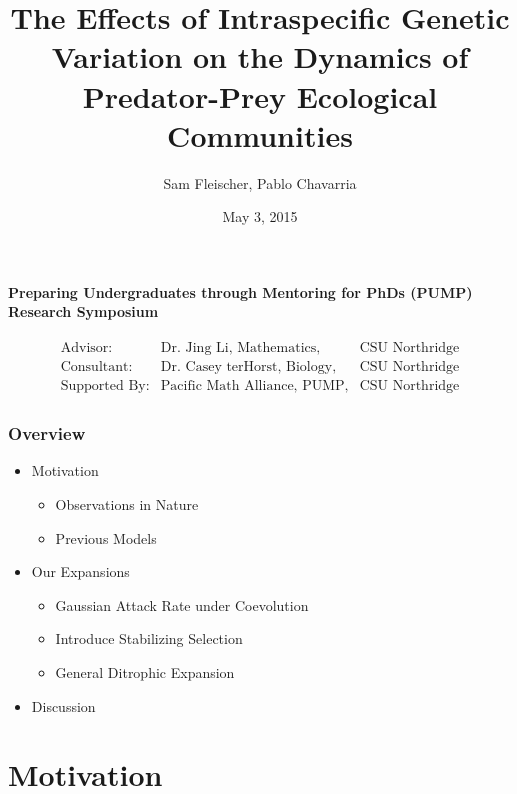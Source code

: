 \documentclass[10pt]{beamer}
\title{The Effects of Intraspecific Genetic Variation on the Dynamics of Predator-Prey Ecological Communities}
\author{\vspace{-15pt} Sam Fleischer, Pablo Chavarria}
\date{\vspace{-5pt} May 3, 2015}
\begin{document}
\begin{frame}
	\titlepage
	\begin{center}
		{\bf Preparing Undergraduates through Mentoring for PhDs (PUMP) Research Symposium}
	\end{center}
	\begin{align*}
		\begin{array}{lll}
		\text{Advisor:} & \text{Dr. Jing Li, Mathematics,} & \text{CSU Northridge} \\
		\text{Consultant:} & \text{Dr. Casey terHorst, Biology,} & \text{CSU Northridge} \\
		\text{Supported By:} & \text{Pacific Math Alliance, PUMP,} & \text{CSU Northridge}
		\end{array}
	\end{align*}
\end{frame}

\begin{frame}
	\frametitle{Overview}
	\begin{itemize}
		\item Motivation
		\begin{itemize}
			\item Observations in Nature
			\item Previous Models
		\end{itemize}
		\item Our Expansions
		\begin{itemize}
			\item Gaussian Attack Rate under Coevolution
			\item Introduce Stabilizing Selection
			\item General Ditrophic Expansion
		\end{itemize}
		\item Discussion
	\end{itemize}
\end{frame}

\section{Motivation}
\end{document}
